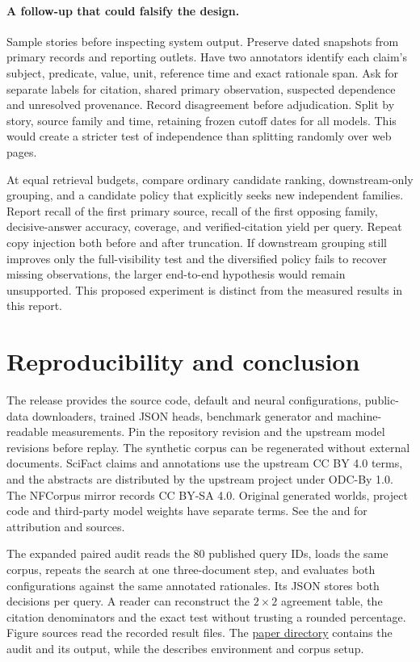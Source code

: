 \paragraph{A follow-up that could falsify the design.} Sample stories before inspecting system output. Preserve dated snapshots from primary records and reporting outlets. Have two annotators identify each claim's subject, predicate, value, unit, reference time and exact rationale span. Ask for separate labels for citation, shared primary observation, suspected dependence and unresolved provenance. Record disagreement before adjudication. Split by story, source family and time, retaining frozen cutoff dates for all models. This would create a stricter test of independence than splitting randomly over web pages.

At equal retrieval budgets, compare ordinary candidate ranking, downstream-only grouping, and a candidate policy that explicitly seeks new independent families. Report recall of the first primary source, recall of the first opposing family, decisive-answer accuracy, coverage, and verified-citation yield per query. Repeat copy injection both before and after truncation. If downstream grouping still improves only the full-visibility test and the diversified policy fails to recover missing observations, the larger end-to-end hypothesis would remain unsupported. This proposed experiment is distinct from the measured results in this report.

\section{Reproducibility and conclusion}
The release provides the source code, default and neural configurations, public-data downloaders, trained JSON heads, benchmark generator and machine-readable measurements. Pin the repository revision and the upstream model revisions before replay. The synthetic corpus can be regenerated without external documents. SciFact claims and annotations use the upstream CC BY 4.0 terms, and the abstracts are distributed by the upstream project under ODC-By 1.0. The NFCorpus mirror records CC BY-SA 4.0. Original generated worlds, project code and third-party model weights have separate terms. See the  and  for attribution and sources.

The expanded paired audit reads the 80 published query IDs, loads the same corpus, repeats the search at one three-document step, and evaluates both configurations against the same annotated rationales. Its JSON stores both decisions per query. A reader can reconstruct the $2\times2$ agreement table, the citation denominators and the exact test without trusting a rounded percentage. Figure sources read the recorded result files. The \href{https://github.com/Rahulchaube1/veritas/tree/main/paper}{paper directory} contains the audit and its output, while the  describes environment and corpus setup.

